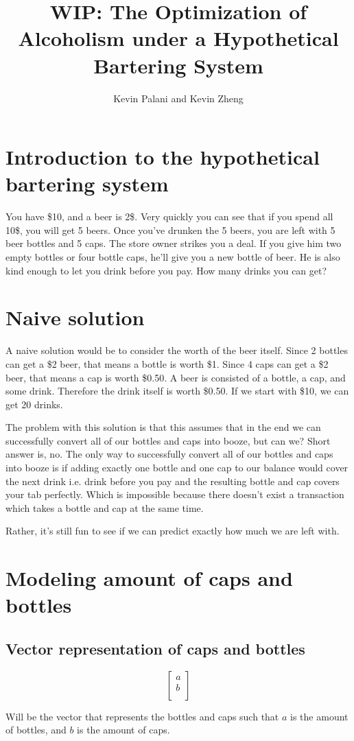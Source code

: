 \documentclass[letterpaper, 12pt]{article}
\title{WIP: The Optimization of Alcoholism under a Hypothetical Bartering System}
\author{Kevin Palani and Kevin Zheng}
\begin{document}
\maketitle
\tableofcontents
\section{Introduction to the hypothetical bartering system}
\par You have \$10, and a beer is 2\$.
Very quickly you can see that if you spend all 10\$, you will get 5 beers.
Once you've drunken the 5 beers, you are left with 5 beer bottles and 5 caps.
The store owner strikes you a deal.
If you give him two empty bottles or four bottle caps, he'll give you a new bottle of beer.
He is also kind enough to let you drink before you pay.
How many drinks you can get?
\section{Naive solution}
A naive solution would be to consider the worth of the beer itself.
Since 2 bottles can get a \$2 beer, that means a bottle is worth \$1.
Since 4 caps can get a \$2 beer, that means a cap is worth \$0.50.
A beer is consisted of a bottle, a cap, and some drink.
Therefore the drink itself is worth \$0.50.
If we start with \$10, we can get 20 drinks.

The problem with this solution is that this assumes that in the end we can successfully convert all of our bottles and caps into booze, but can we?
Short answer is, no.
The only way to successfully convert all of our bottles and caps into booze is if adding exactly one bottle and one cap to our balance would cover the next drink i.e. drink before you pay and the resulting bottle and cap covers your tab perfectly.
Which is impossible because there doesn't exist a transaction which takes a bottle and cap at the same time.

Rather, it's still fun to see if we can predict exactly how much we are left with.
\section{Modeling amount of caps and bottles}
\subsection{Vector representation of caps and bottles}
\[
    \begin{bmatrix}
        a\\
        b\\
    \end{bmatrix}
\]
\par Will be the vector that represents the bottles and caps such that $a$ is the amount of bottles, and $b$ is the amount of caps.
\end{document}
